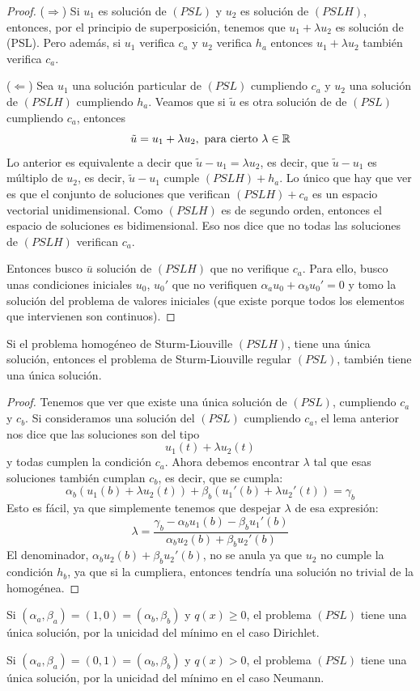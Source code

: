 \begin{proof}
($\Rightarrow$) Si $u_1$ es solución de $(PSL)$ y $u_2$ es solución de $(PSLH)$, entonces, por el principio de superposición, tenemos que $u_1+\lambda u_2$ es solución de (PSL).
Pero además, si $u_1$ verifica $c_a$ y $u_2$ verifica $h_a$ entonces $u_1+\lambda u_2$ también verifica $c_a$.

($\Leftarrow$) Sea $u_1$ una solución particular de $(PSL)$ cumpliendo $c_a$ y $u_2$ una solución de $(PSLH)$ cumpliendo $h_a$. Veamos que si $\tilde{u}$ es otra solución de de $(PSL)$ cumpliendo $c_a$, entonces 
\[
\tilde{u}=u_1+\lambda u_2, \text{ para cierto } \lambda\in\mathbb{R}
\]
Lo anterior es equivalente a decir que $\tilde{u}-u_1=\lambda u_2$, es decir, que $\tilde{u}-u_1$ es múltiplo de $u_2$, es decir, $\tilde{u}-u_1$ cumple $(PSLH)+h_a$. Lo único que hay que ver es que el conjunto de soluciones que verifican $(PSLH) +c_a$ es un espacio vectorial unidimensional. Como $(PSLH)$ es de segundo orden, entonces el espacio de soluciones es bidimensional. Eso nos dice que no todas las soluciones de $(PSLH)$ verifican $c_a$.

Entonces busco $\bar{u}$ solución de $(PSLH)$ que no verifique $c_a$. Para ello, busco unas condiciones iniciales $u_0$, $u_0'$ que no verifiquen $\alpha_a u_0+\alpha_b u_0'=0$ y tomo la solución del problema de valores iniciales (que existe porque todos los elementos que intervienen son continuos).
\end{proof}

\begin{theorem}
Si el problema homogéneo de Sturm-Liouville $(PSLH)$, tiene una única solución, entonces el problema de Sturm-Liouville regular $(PSL)$,   también tiene una única solución.
\end{theorem}
\begin{proof}
Tenemos que ver que existe una única solución de $(PSL)$, cumpliendo $c_a$ y $c_b$. Si consideramos una solución del $(PSL)$ cumpliendo $c_a$, el lema anterior nos dice que las soluciones son del tipo 
\[
u_1(t)+\lambda u_2(t)
\]
y todas cumplen la condición $c_a$. Ahora debemos encontrar $\lambda$ tal que esas soluciones también cumplan $c_b$, es decir, que se cumpla:
\[
\alpha_b(u_1(b)+\lambda u_2(t))+\beta_b(u_1'(b)+\lambda u_2'(t))=\gamma_b
\]
Esto es fácil, ya que simplemente tenemos que despejar $\lambda$ de esa expresión:
\[
\lambda=\frac{\gamma_b-\alpha_bu_1(b)-\beta_bu_1'(b)}{\alpha_bu_2(b)+\beta_bu_2'(b)}
\]
El denominador, $\alpha_bu_2(b)+\beta_bu_2'(b)$, no se anula ya que $u_2$ no cumple la condición $h_b$, ya que si la cumpliera, entonces tendría una solución no trivial de la homogénea.
\end{proof}


\begin{coro}
Si $(\alpha_a,\beta_a)=(1,0)=(\alpha_b,\beta_b)$ y $q(x)\geq 0$, el problema $(PSL)$ tiene una única solución, por la unicidad del mínimo en el caso Dirichlet.
\end{coro}
\begin{coro}
Si $(\alpha_a,\beta_a)=(0,1)=(\alpha_b,\beta_b)$ y $q(x)>0$, el problema $(PSL)$ tiene una única solución, por la unicidad del mínimo en el caso Neumann.
\end{coro}